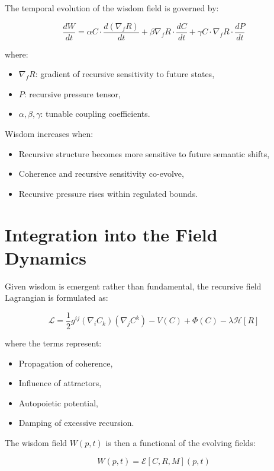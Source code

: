 The temporal evolution of the wisdom field is governed by:

\begin{equation}
\frac{dW}{dt} = \alpha C \cdot \frac{d(\nabla_f R)}{dt} + \beta \nabla_f R \cdot \frac{dC}{dt} + \gamma C \cdot \nabla_f R \cdot \frac{dP}{dt}
\end{equation}

where:
\begin{itemize}
    \item \(\nabla_f R\): gradient of recursive sensitivity to future states,
    \item \(P\): recursive pressure tensor,
    \item \(\alpha, \beta, \gamma\): tunable coupling coefficients.
\end{itemize}

Wisdom increases when:
\begin{itemize}
    \item Recursive structure becomes more sensitive to future semantic shifts,
    \item Coherence and recursive sensitivity co-evolve,
    \item Recursive pressure rises within regulated bounds.
\end{itemize}

\section{Integration into the Field Dynamics}

Given wisdom is emergent rather than fundamental, the recursive field Lagrangian is formulated as:

\begin{equation}
\mathcal{L} = \frac{1}{2} g^{ij} (\nabla_i C_k)(\nabla_j C^k) - V(C) + \Phi(C) - \lambda \mathcal{H}[R]
\end{equation}

where the terms represent:
\begin{itemize}
    \item Propagation of coherence,
    \item Influence of attractors,
    \item Autopoietic potential,
    \item Damping of excessive recursion.
\end{itemize}

The wisdom field \(W(p, t)\) is then a functional of the evolving fields:

\begin{equation}
W(p, t) = \mathcal{E}[C, R, M](p, t)
\end{equation}

